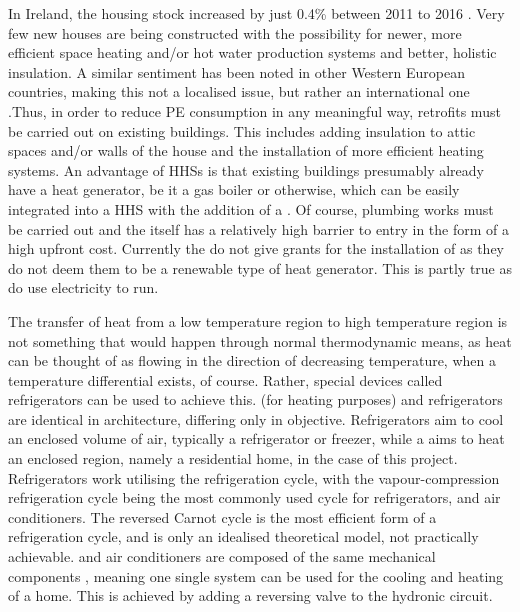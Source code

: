 In Ireland, the housing stock increased by just 0.4\% between 2011 to 2016 \cite{cso_2020}. Very few new houses are being constructed with the possibility for newer, more efficient space heating and/or hot water production systems and better, holistic insulation. A similar sentiment has been noted in other Western European countries, making this not a localised issue, but rather an international one \cite{klein_numerical_2014, dongellini_influence_2021} .Thus, in order to reduce \ac{PE} consumption in any meaningful way, retrofits must be carried out on existing buildings. This includes adding insulation to attic spaces and/or walls of the house and the installation of more efficient heating systems. An advantage of \acp{HHS} is that existing buildings presumably already have a heat generator, be it a gas boiler or otherwise, which can be easily integrated into a \ac{HHS} with the addition of a \HP. Of course, plumbing works must be carried out and the \HP itself has a relatively high barrier to entry in the form of a high upfront cost. Currently the \citeauthor{seai_2020} do not give grants for the installation of \HPs as they do not deem them to be a renewable type of heat generator. This is partly true as \HPs do use electricity to run. 

The transfer of heat from a low temperature region to high temperature region is not something that would happen through normal thermodynamic means, as heat can be thought of as flowing in the direction of decreasing temperature, when a temperature differential exists, of course. Rather, special devices called refrigerators can be used to achieve this. \HPs (for heating purposes) and refrigerators are identical in architecture, differing only in objective. Refrigerators aim to cool an enclosed volume of air, typically a refrigerator or freezer, while a \HP aims to heat an enclosed region, namely a residential home, in the case of this project. Refrigerators work utilising the refrigeration cycle, with the vapour-compression refrigeration cycle being the most commonly used cycle for refrigerators, \HPs and air conditioners. The reversed Carnot cycle is the most efficient form of a refrigeration cycle, and is only an idealised theoretical model, not practically achievable.
\HPs and air conditioners are composed of the same mechanical components \cite{cengel_thermo_2020}, meaning one single system can be used for the cooling and heating of a home. This is achieved by adding a reversing valve to the hydronic circuit.

